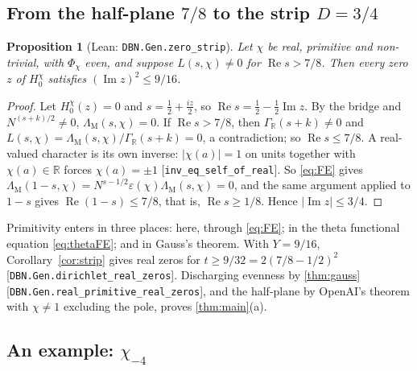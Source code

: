\documentclass[11pt]{article}
\newtheorem{proposition}[theorem]{Proposition}
\theoremstyle{definition}
\newcommand{\lean}[1]{\texttt{#1}}
\newcommand{\re}{\operatorname{Re}}
\newcommand{\im}{\operatorname{Im}}
\newcommand{\R}{\mathbb{R}}
\newcommand{\GR}{\Gamma_{\mathbb{R}}}
\newcommand{\Lc}{\Lambda}
\begin{document}
\subsection{From the half-plane $7/8$ to the strip $D = 3/4$}\label{sec:strip}

\begin{proposition}[Lean: \lean{DBN.Gen.zero\_\allowbreak{}strip}]\label{prop:strip}
Let $\chi$ be real, primitive and non-trivial, with $\Phi_\chi$ even, and suppose $L(s,\chi) \ne 0$ for $\re s > 7/8$. Then every zero $z$ of $H^\chi_0$ satisfies $(\im z)^2 \le 9/16$.
\end{proposition}

\begin{proof}
Let $H^\chi_0(z) = 0$ and $s = \tfrac12 + \tfrac{iz}2$, so $\re s = \tfrac12 - \tfrac12\im z$. By the bridge and $N^{(s+k)/2} \ne 0$, $\Lc_{\mathrm{M}}(s,\chi) = 0$. If $\re s > 7/8$, then $\GR(s+k) \ne 0$ and $L(s,\chi) = \Lc_{\mathrm{M}}(s,\chi)/\GR(s+k) = 0$, a contradiction; so $\re s \le 7/8$. A real-valued character is its own inverse: $|\chi(a)| = 1$ on units together with $\chi(a) \in \R$ forces $\chi(a) = \pm1$ [\lean{inv\_\allowbreak{}eq\_\allowbreak{}self\_\allowbreak{}of\_\allowbreak{}real}]. So \eqref{eq:FE} gives $\Lc_{\mathrm{M}}(1-s,\chi) = N^{s-1/2}\varepsilon(\chi)\Lc_{\mathrm{M}}(s,\chi) = 0$, and the same argument applied to $1-s$ gives $\re(1-s) \le 7/8$, that is, $\re s \ge 1/8$. Hence $|\im z| \le 3/4$.
\end{proof}

\noindent
Primitivity enters in three places: here, through \eqref{eq:FE}; in the theta functional equation \eqref{eq:thetaFE}; and in Gauss's theorem. With $Y = 9/16$, Corollary~\ref{cor:strip} gives real zeros for $t \ge 9/32 = 2(7/8 - 1/2)^2$ [\lean{DBN.Gen.dirichlet\_\allowbreak{}real\_\allowbreak{}zeros}]. Discharging evenness by \cref{thm:gauss} [\lean{DBN.Gen.real\_\allowbreak{}primitive\_\allowbreak{}real\_\allowbreak{}zeros}], and the half-plane by OpenAI's theorem with $\chi \ne 1$ excluding the pole, proves \cref{thm:main}(a).

\subsection{An example: $\chi_{-4}$}\label{sec:chi4}
\end{document}
